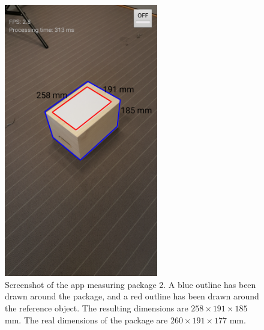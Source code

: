 \begin{figure}[H]
\begin{center}
\includegraphics[width=0.6\textwidth]{figures/screenshot.png}
\end{center}
\caption{Screenshot of the app measuring package 2. A blue outline has been drawn around the package, and a red outline has been drawn around the reference object. The resulting dimensions are $258 \times 191 \times 185$ mm. The real dimensions of the package are $260 \times 191 \times 177$ mm.}
\label{fig:screenshot}
\end{figure}
